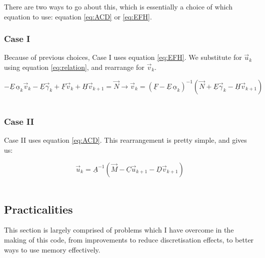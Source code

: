 \documentclass[11pt]{amsart}
\begin{document}
There are two ways to go about this, which is essentially a choice of which equation to use: equation \ref{eq:ACD} or \ref{eq:EFH}.

\subsubsection{Case I}

Because of previous choices, Case I uses equation \ref{eq:EFH}.  We substitute for $\vec{u}_{k}$ using equation \ref{eq:relation}, and rearrange for $\vec{v}_{k}$.

\begin{equation} \label{eq:Case_I}
- \underline{E} \, \underline{\alpha}_{k} \vec{v}_{k}  -  \underline{E} \vec{\gamma}_{k} + \underline{F} \vec{v}_{k} + \underline{H} \vec{v}_{k+1} = \vec{N}
\longrightarrow   \vec{v}_{k}  =  \left(  \underline{F}  -  \underline{E} \, \underline{\alpha}_{k}  \right)^{-1}  \left(  \vec{N}  +  \underline{E} \vec{\gamma}_{k}  -  \underline{H} \vec{v}_{k+1} \right)
\end{equation} 
\\



\subsubsection{Case II}

Case II uses equation \ref{eq:ACD}.  This rearrangement is pretty simple, and gives us:

\begin{equation} \label{eq:Case_II}
\vec{u}_{k}  =  \underline{A}^{-1}  \left(  \vec{M}  -  \underline{C} \vec{u}_{k+1}  -  \underline{D} \vec{v}_{k+1} \right)
\end{equation} 
\\









\subsection{Practicalities}

This section is largely comprised of problems which I have overcome in the making of this code, from improvements to reduce discretisation effects, to better ways to use memory effectively.
\end{document}
